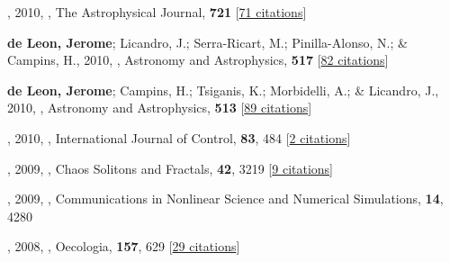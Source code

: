 \item[{\color{numcolor}\scriptsize38}] , 2010, , The Astrophysical Journal, \textbf{721} [\href{https://ui.adsabs.harvard.edu/abs/2010ApJ...721L..53C}{71 citations}]

\item[{\color{numcolor}\scriptsize37}] \textbf{de Leon, Jerome}; Licandro, J.; Serra-Ricart, M.; Pinilla-Alonso, N.; \& Campins, H., 2010, , Astronomy and Astrophysics, \textbf{517} [\href{https://ui.adsabs.harvard.edu/abs/2010A&A...517A..23D}{82 citations}]

\item[{\color{numcolor}\scriptsize36}] \textbf{de Leon, Jerome}; Campins, H.; Tsiganis, K.; Morbidelli, A.; \& Licandro, J., 2010, , Astronomy and Astrophysics, \textbf{513} [\href{https://ui.adsabs.harvard.edu/abs/2010A&A...513A..26D}{89 citations}]

\item[{\color{numcolor}\scriptsize35}] , 2010, , International Journal of Control, \textbf{83}, 484 [\href{https://ui.adsabs.harvard.edu/abs/2010IJC....83..484G}{2 citations}]

\item[{\color{numcolor}\scriptsize34}] , 2009, , Chaos Solitons and Fractals, \textbf{42}, 3219 [\href{https://ui.adsabs.harvard.edu/abs/2009CSF....42.3219R}{9 citations}]

\item[{\color{numcolor}\scriptsize33}] , 2009, , Communications in Nonlinear Science and Numerical Simulations, \textbf{14}, 4280

\item[{\color{numcolor}\scriptsize32}] , 2008, , Oecologia, \textbf{157}, 629 [\href{https://ui.adsabs.harvard.edu/abs/2008Oecol.157..629F}{29 citations}]

